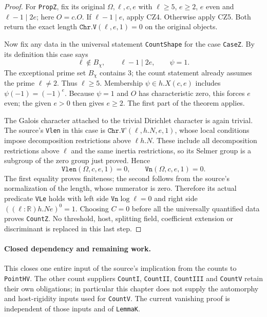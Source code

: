 \begin{proof}
For \texttt{PropZ}, fix its original $\Omega,\ell,c,e$ with
$\ell\ge5$, $e\ge2$, $e$ even and $\ell-1\mid2e$;
here $O=c.O$.  If $\ell-1\mid e$, apply CZ4.  Otherwise
apply CZ5.  Both return the exact length
$\texttt{Chr.V}(\ell,e,1)=0$ on the original objects.

Now fix any data in the universal statement \texttt{CountShape}
for the case \texttt{CaseZ}.  By its definition this case says
\[
          \ell\notin B_\chi,\qquad
          \ell-1\mid2e,\qquad \psi=1.
          \tag{CZ.11}
\]
The exceptional prime set $B_\chi$ contains $3$; the count
statement already assumes the prime $\ell\ne2$.  Thus
$\ell\ge5$.  Membership $\psi\in h.X(c,e)$ includes
$\psi(-1)=(-1)^e$.  Because $\psi=1$ and $O$ has
characteristic zero, this forces $e$ even; the given $e>0$
then gives $e\ge2$.  The first part of the theorem applies.

The Galois character attached to the trivial Dirichlet character
is again trivial.  The source's \texttt{Vlen} in this case is
$\texttt{Chr.V'}(\ell,h.N,e,1)$, whose local conditions impose
decomposition restrictions above $\ell h.N$.  These include
all decomposition restrictions above $\ell$ and the same
inertia restrictions, so its Selmer group is a subgroup of the
zero group just proved.  Hence
\[
 \texttt{Vlen}(\Omega,c,e,1)=0,
 \qquad \texttt{Vn}(\Omega,c,e,1)=0.
 \tag{CZ.12}
\]
The first equality proves finiteness; the second follows from
the source's normalization of the length, whose numerator is
zero.  Therefore its actual predicate \texttt{VLe} holds with
left side $\texttt{Vn}\log\ell=0$ and right side
$((\ell:\mathbb R)h.N e)^0=1$.
Choosing $C=0$ before all the universally quantified data proves
\texttt{CountZ}.  No threshold, host, splitting field, coefficient
extension or discriminant is replaced in this last step.
\end{proof}

\paragraph{Closed dependency and remaining work.}
This closes one entire input of the source's implication from the
counts to \texttt{PointHV}.  The other count suppliers
\texttt{CountI}, \texttt{CountII}, \texttt{CountIII} and
\texttt{CountV} retain their own obligations; in particular this
chapter does not supply the automorphy and host-rigidity inputs
used for \texttt{CountV}.  The current vanishing proof is independent
of those inputs and of \texttt{LemmaK}.
